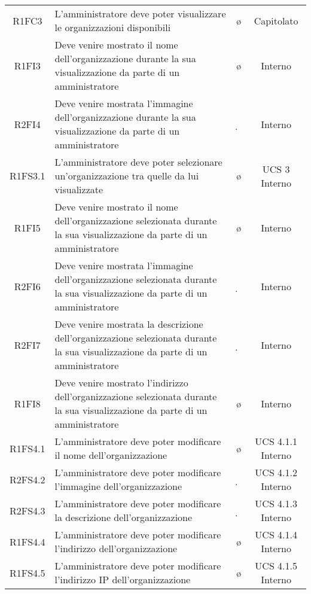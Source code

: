 {\begin{longtable}{ c C{8cm} c c}
R1FC3 & L'amministratore deve poter visualizzare le organizzazioni disponibili & \o & Capitolato\\

R1FI3 & Deve venire mostrato il nome dell'organizzazione durante la sua visualizzazione da parte di un amministratore & \o & Interno\\

R2FI4 & Deve venire mostrata l'immagine dell'organizzazione durante la sua visualizzazione da parte di un amministratore & \d & Interno\\

R1FS3.1 & L'amministratore deve poter selezionare un'organizzazione tra quelle da lui visualizzate & \o & UCS 3 Interno\\

R1FI5 & Deve venire mostrato il nome dell'organizzazione selezionata durante la sua visualizzazione da parte di un amministratore & \o & Interno\\

R2FI6 & Deve venire mostrata l'immagine dell'organizzazione selezionata durante la sua visualizzazione da parte di un amministratore & \d & Interno\\

R2FI7 & Deve venire mostrata la descrizione dell'organizzazione selezionata durante la sua visualizzazione da parte di un amministratore & \d & Interno\\

R1FI8 & Deve venire mostrato l'indirizzo dell'organizzazione selezionata durante la sua visualizzazione da parte di un amministratore & \o & Interno\\


R1FS4.1 & L'amministratore deve poter modificare il nome dell'organizzazione & \o & UCS 4.1.1 Interno\\

R2FS4.2 & L'amministratore deve poter modificare l'immagine dell'organizzazione & \d & UCS 4.1.2 Interno\\

R2FS4.3 & L'amministratore deve poter modificare la descrizione dell'organizzazione & \d & UCS 4.1.3 Interno\\

R1FS4.4 & L'amministratore deve poter modificare l'indirizzo dell'organizzazione & \o & UCS 4.1.4 Interno\\

R1FS4.5 & L'amministratore deve poter modificare l'indirizzo IP dell'organizzazione & \o & UCS 4.1.5 Interno\\


\end{longtable}}
